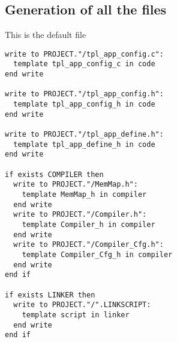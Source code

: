 \subsection{Generation of all the files}

This is the default  file

\begin{lstlisting}
write to PROJECT."/tpl_app_config.c":
  template tpl_app_config_c in code
end write

write to PROJECT."/tpl_app_config.h":
  template tpl_app_config_h in code
end write

write to PROJECT."/tpl_app_define.h":
  template tpl_app_define_h in code
end write

if exists COMPILER then
  write to PROJECT."/MemMap.h":
    template MemMap_h in compiler
  end write
  write to PROJECT."/Compiler.h":
    template Compiler_h in compiler
  end write
  write to PROJECT."/Compiler_Cfg.h":
    template Compiler_Cfg_h in compiler
  end write
end if

if exists LINKER then
  write to PROJECT."/".LINKSCRIPT:
    template script in linker
  end write
end if
\end{lstlisting}

